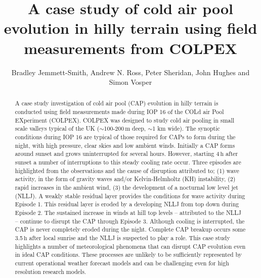 \documentclass[times]{qjrms4}
\begin{document}

\title{A case study of cold air pool evolution in hilly terrain using field measurements from COLPEX}

\author{Bradley Jemmett-Smith\corrauth, Andrew N. Ross, Peter Sheridan, John Hughes and Simon Vosper}

\address{ University of Leeds, Leeds, UK  Met Office, Exeter, UK}


\begin{abstract}
A case study investigation of cold air pool (CAP) evolution in hilly terrain is conducted using field measurements made during IOP 16 of the COLd air Pool EXperiment (COLPEX). COLPEX was designed to study cold air pooling in small scale valleys typical of the UK ($\sim$100-200$\,\mbox{m}$ deep, $\sim$1 km wide). The synoptic conditions during IOP 16 are typical of those required for CAPs to form during the night, with high pressure, clear skies and low ambient winds. Initially a CAP forms around sunset and grows uninterrupted for several hours. However, starting 4$\,\mbox{h}$ after sunset a number of interruptions to this steady cooling rate occur. Three episodes are highlighted from the observations and the cause of disruption attributed to; (1) wave activity, in the form of gravity waves and/or Kelvin-Helmholtz (KH) instability, (2) rapid increases in the ambient wind, (3) the development of a nocturnal low level jet (NLLJ). A weakly stable residual layer provides the conditions for wave activity during Episode 1. This residual layer is eroded by a developing NLLJ from top down during Episode 2. The sustained increase in winds at hill top levels -- attributed to the NLLJ -- continue to disrupt the CAP through Episode 3. Although cooling is interrupted, the CAP is never completely eroded during the night. Complete CAP breakup occurs some 3.5$\,\mbox{h}$ after local sunrise and the NLLJ is suspected to play a role. This case study highlights a number of meteorological phenomena that can disrupt CAP evolution even in ideal CAP conditions. These processes are unlikely to be sufficiently represented by current operational weather forecast models and can be challenging even for high resolution research models.
\end{abstract}
\end{document}
